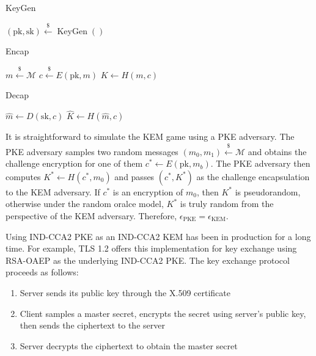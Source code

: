 \documentclass{article}
\newcommand{\leftsample}{\overset{{\scriptscriptstyle\$}}{\leftarrow}}
\begin{document}
    \begin{multicols}{3}
        \begin{algorithm}[H]
            \SetAlgoLined
            \caption{KeyGen}
            $(\text{pk}, \text{sk}) \leftsample \operatorname{KeyGen}()$ \;
        \end{algorithm}

        \begin{algorithm}[H]
            \SetAlgoLined
            \caption{Encap}
            $m \leftsample \mathcal{M}$\;
            $c \leftsample E(\text{pk}, m)$\;
            $K \leftarrow H(m, c)$\;
            \;
        \end{algorithm}

        \begin{algorithm}[H]
            \SetAlgoLined
            \caption{Decap}
            $\hat{m} \leftarrow D(\text{sk}, c)$\;
            $\hat{K} \leftarrow H(\hat{m}, c)$\;
            \;
        \end{algorithm}
    \end{multicols}

    It is straightforward to simulate the KEM game using a PKE adversary. The PKE adversary samples two random messages $(m_0, m_1) \leftsample \mathcal{M}$ and obtains the challenge encryption for one of them $c^\ast \leftarrow E(\text{pk}, m_b)$. The PKE adversary then computes $K^\ast \leftarrow H(c^\ast, m_0)$ and passes $(c^\ast, K^\ast)$ as the challenge encapsulation to the KEM adversary. If $c^\ast$ is an encryption of $m_0$, then $K^\ast$ is pseudorandom, otherwise under the random oralce model, $K^\ast$ is truly random from the perspective of the KEM adversary. Therefore, $\epsilon_\text{PKE} = \epsilon_\text{KEM}$.

    Using IND-CCA2 PKE as an IND-CCA2 KEM has been in production for a long time. For example, TLS 1.2 \cite{dierks2008rfc} offers this implementation for key exchange using RSA-OAEP\cite{bellare1995optimal} as the underlying IND-CCA2 PKE. The key exchange protocol proceeds as follows:

    \begin{enumerate}
        \item Server sends its public key through the X.509 certificate
        \item Client samples a master secret, encrypts the secret using server's public key, then sends the ciphertext to the server
        \item Server decrypts the ciphertext to obtain the master secret
    \end{enumerate}
\end{document}
